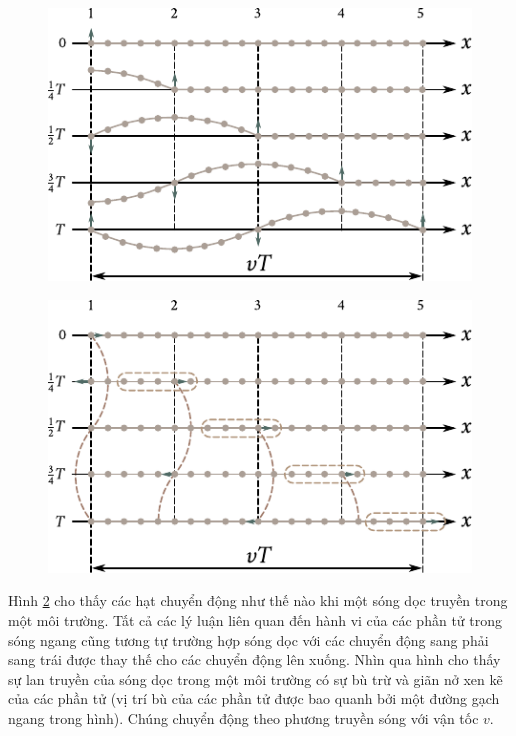 \begin{figure}[!htb]
	\begin{center}
		\includegraphics[scale=1]{figures/ch_14/fig_14_1.pdf}
		\caption[]{}
		\label{fig:14_1}
	\end{center}
	\vspace{-1mm}
\end{figure}

\begin{figure}[!htb]
	\begin{center}
		\includegraphics[scale=1]{figures/ch_14/fig_14_2.pdf}
		\caption[]{}
		\label{fig:14_2}
	\end{center}
\end{figure}

Hình \ref{fig:14_2} cho thấy các hạt chuyển động như thế nào khi một sóng dọc truyền trong một môi trường. Tất cả các lý luận liên quan đến hành vi của các phần tử trong sóng ngang cũng tương tự trường hợp sóng dọc với các chuyển động sang phải sang trái được thay thế cho các chuyển động lên xuống. Nhìn qua hình cho thấy sự lan truyền của sóng dọc trong một môi trường có sự bù trừ và giãn nở xen kẽ của các phần tử (vị trí bù của các phần tử được bao quanh bởi một đường gạch ngang trong hình). Chúng chuyển động theo phương truyền sóng với vận tốc $v$.

